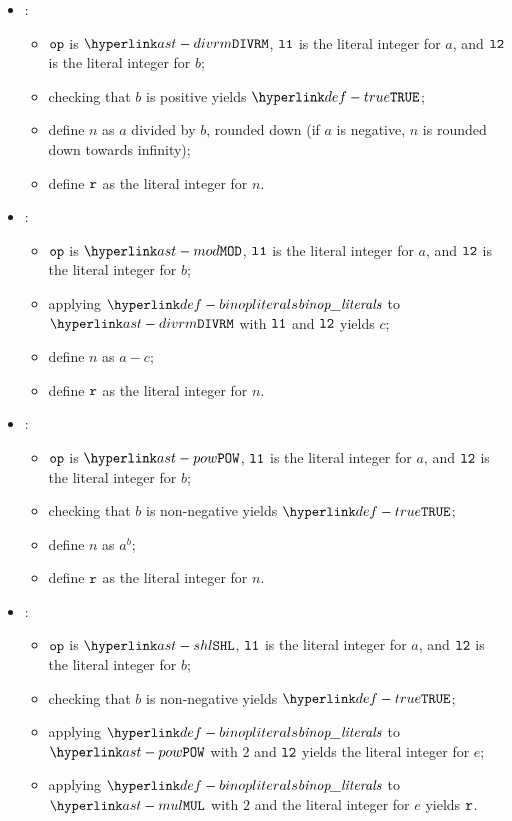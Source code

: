 \begin{itemize}
  \item {}:
  \begin{itemize}
    \item $\texttt{op}$ is $\DIVRM$, $\texttt{l1}$ is the literal integer for $a$, and $\texttt{l2}$ is the literal integer for $b$;
    \item checking that $b$ is positive yields $\True$\ProseOrTypeError;
    \item define $n$ as $a$ divided by $b$, rounded down (if $a$ is negative, $n$ is rounded down towards infinity);
    \item define $\texttt{r}$ as the literal integer for $n$.
  \end{itemize}

  \item {}:
  \begin{itemize}
    \item $\texttt{op}$ is $\MOD$, $\texttt{l1}$ is the literal integer for $a$, and $\texttt{l2}$ is the literal integer for $b$;
    \item applying $\binopliterals$ to $\DIVRM$ with $\texttt{l1}$ and $\texttt{l2}$ yields $c$\ProseOrTypeError;
    \item define $n$ as $a-c$;
    \item define $\texttt{r}$ as the literal integer for $n$.
  \end{itemize}

  \item {}:
  \begin{itemize}
    \item $\texttt{op}$ is $\POW$, $\texttt{l1}$ is the literal integer for $a$, and $\texttt{l2}$ is the literal integer for $b$;
    \item checking that $b$ is non-negative yields $\True$\ProseOrTypeError;
    \item define $n$ as $a^b$;
    \item define $\texttt{r}$ as the literal integer for $n$.
  \end{itemize}

  \item {}:
  \begin{itemize}
    \item $\texttt{op}$ is $\SHL$, $\texttt{l1}$ is the literal integer for $a$, and $\texttt{l2}$ is the literal integer for $b$;
    \item checking that $b$ is non-negative yields $\True$\ProseOrTypeError;
    \item applying $\binopliterals$ to $\POW$ with $2$ and $\texttt{l2}$ yields the literal integer for $e$;
    \item applying $\binopliterals$ to $\MUL$ with $2$ and the literal integer for $e$ yields $\texttt{r}$.
  \end{itemize}


\end{itemize}
